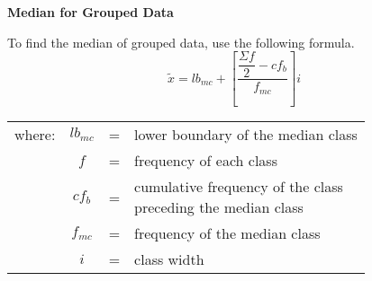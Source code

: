 \begin{center}
\textbf{Median for Grouped Data}
\end{center}

\vspace*{1ex}

To find the median of grouped data, use the following formula.
\[
\tilde{x}=lb_{mc} + \left[\dfrac{\dfrac{\Sigma f}{2} - cf_b}{f_{mc}} \right]i
\] 

\begin{center}
\begin{tabular}{lcll}
where: & $lb_{mc}$ & = & lower boundary of the median class \\
 & $f $& = & frequency of each class \\
& $cf_b$ & = & \makecell[tl]{cumulative frequency of the class \\ preceding the median class} \\ 
& $f_{mc} $ & = & frequency of the median class \\ 
& $i$ & = & class width\\ 
\end{tabular} 
\end{center}

